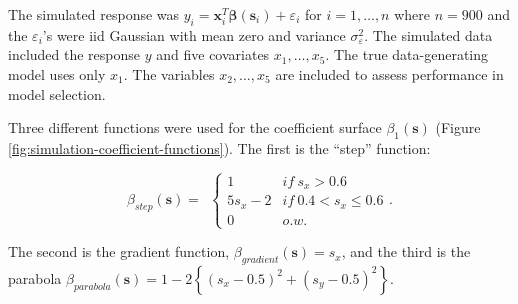 \documentclass[authoryear,review, 12pt]{elsarticle}
\begin{document}
The simulated response was $y_{i}=\bm{x}_{i}^{T}\bm{\beta}(\bm{s}_{i})+\varepsilon_{i}$
for $i=1,\dots,n$ where $n=900$ and the $\varepsilon_{i}$'s were
iid Gaussian with mean zero and variance $\sigma_{\varepsilon}^{2}$.
The simulated data included the response $y$ and five covariates
$x_{1},\dots,x_{5}$. The true data-generating model uses only $x_{1}$.
The variables $x_{2},\dots,x_{5}$ are included to assess performance
in model selection. 

Three different functions were used for the coefficient surface $\beta_{1}(\bm{s})$
(Figure \ref{fig:simulation-coefficient-functions}). The first is
the ``step'' function:

\[
\beta_{step}(\bm{s})=\ \ \begin{cases}
1 & if\ s_{x}>0.6\\
5s_{x}-2 & if\ 0.4<s_{x}\le0.6\\
0 & o.w.
\end{cases}.
\]


The second is the gradient function, $\beta_{gradient}(\bm{s})=s_{x}$,
and the third is the parabola $\beta_{parabola}(\bm{s})=1-2\left\{ (s_{x}-0.5)^{2}+(s_{y}-0.5)^{2}\right\} $.
\end{document}
